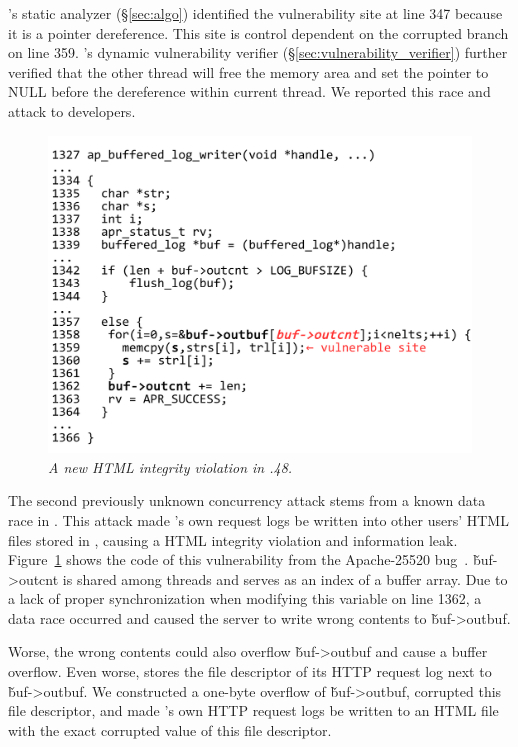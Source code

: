 \xxx's static analyzer (\S\ref{sec:algo}) identified the vulnerability site at 
line 347 because it is a pointer dereference. This site is 
control dependent on the corrupted branch on line 359. \xxx's dynamic 
vulnerability verifier (\S\ref{sec:vulnerability_verifier}) further verified 
that the other thread will free the memory area and set the pointer to NULL 
before the dereference within current thread. We reported this race and attack 
to \ssdb developers.

\begin{figure}[h]
	\centering
	\vspace{-.15in}
	\includegraphics[width=0.9\columnwidth]{figures/apache-25520}
	\vspace{-.15in}
	\caption{{\em A new HTML integrity violation in .48.}} 
	\label{fig:apache-25520}
	\vspace{-.1in}
\end{figure}

The second previously unknown concurrency attack stems from a known 
data race in \apache. This attack made \apache's own request logs be written 
into other users' HTML files stored in \apache, causing a HTML integrity 
violation and information leak. Figure~\ref{fig:apache-25520} shows the code of 
this vulnerability from the Apache-25520 bug~\cite{apache-bug-25520}.
\v{buf->outcnt} is shared among threads and serves as an index of a buffer
array. Due to a lack of proper synchronization when modifying this variable on
line 1362, a data race occurred and caused the server to write wrong 
contents to \v{buf->outbuf}. 

Worse, the wrong contents could also overflow \v{buf->outbuf} and cause a
buffer overflow. Even worse, \apache stores the file descriptor of its 
HTTP request log next to \v{buf->outbuf}. We constructed a one-byte 
overflow of \v{buf->outbuf}, corrupted this file descriptor, and made 
\apache's own HTTP request logs be written to an HTML file with the 
exact corrupted value of this file descriptor.

